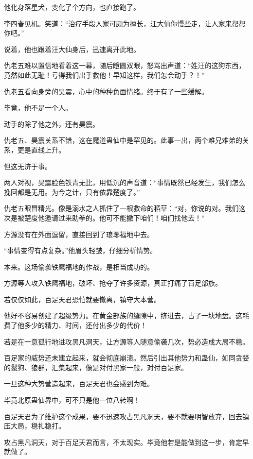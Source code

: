 \begin{this_body}
他化身落星犬，变化了个方向，也直接跑了。

李四春见机。笑道：“治疗手段人家可颇为擅长，汪大仙你慢些走，让人家来帮帮你吧。”

说着，他也跟着汪大仙身后，迅速离开此地。

仇老五难以置信地看着这一幕，随后瞪圆双眼，怒骂出声道：“姓汪的这狗东西，竟然如此无耻！亏得我们出手救他！早知这样，我们怎会动手？！”

仇老五看向身旁的昊震，心中的种种负面情绪。终于有了一些缓解。

毕竟，他不是一个人。

动手的除了他之外，还有昊震。

仇老五、昊震关系不错，这在魔道蛊仙中是罕见的。此事一出，两个难兄难弟的关系，更是直线上升。

但这无济于事。

两人对视，昊震脸色铁青无比，用低沉的声音道：“事情既然已经发生，我们怎么挽回都是无用。为今之计，只有依靠楚度了。”

仇老五眼冒精光。像是溺水之人抓住了一根救命的稻草：“对，你说的对。我们这次是被楚度他邀请过来助拳的。他可不能撇下咱们！咱们找他去！”

方源没有在外面逗留，直接回到了琅琊福地中去。

“事情变得有点复杂。”他眉头轻皱，仔细分析情势。

本来。这场偷袭铁鹰福地的作战，是相当成功的。

方源等人攻入铁鹰福地，破坏、抢夺了许多资源，真正打痛了百足部族。

若仅仅如此，百足天君恐怕就要撤离，镇守大本营。

他好不容易创建了超级势力。在黄金部族的缝隙中，挤进去，占了一块地盘。这耗费了他多少的精力、时间，还付出多少的代价！

若是在一意孤行地进攻黑凡洞天，让方源等人随意偷袭几次，势必造成大局不稳。

百足家的威势还未建立起来，就会彻底崩溃。然后引出其他势力和蛊仙，如同贪婪的鬣狗、狼群，汇集起来，像是对付黑家一般，对付百足家。

一旦这种大势营造起来，百足天君也会感到为难。

毕竟北原蛊仙界中，可不只是他一位八转啊！

百足天君为了维护这个成果，要不迅速攻占黑凡洞天，要不就要明智放弃，回去镇压大局，稳扎稳打。

攻占黑凡洞天，对于百足天君而言，不太现实。毕竟他若是能做到这一步，肯定早就做了。


\end{this_body}
